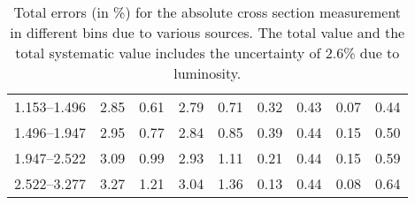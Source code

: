 \begin{table}
\begin{center}
\begin{tabular}{@{}l l l l l l l l l@{}}
            1.153--1.496    &  2.85   &  0.61   &  2.79         &  0.71      &  0.32    &  0.43  &  0.07       &  0.44  \\
            1.496--1.947    &  2.95   &  0.77   &  2.84         &  0.85      &  0.39    &  0.44  &  0.15       &  0.50  \\
            1.947--2.522    &  3.09   &  0.99   &  2.93         &  1.11      &  0.21    &  0.44  &  0.15       &  0.59  \\
            2.522--3.277    &  3.27   &  1.21   &  3.04         &  1.36      &  0.13    &  0.44  &  0.08       &  0.64  \\
            \bottomrule
        \end{tabular}
    \end{center}
    \caption[
        Total errors (in \%) for the absolute cross section measurement.
    ]{
        Total errors (in \%) for the absolute cross section measurement in
        different \phistar bins due to various sources. The total value and the
        total systematic value includes the uncertainty of 2.6\% due to
        luminosity.
    }
    \label{tab:sys_uncert_abs}
\end{table}
